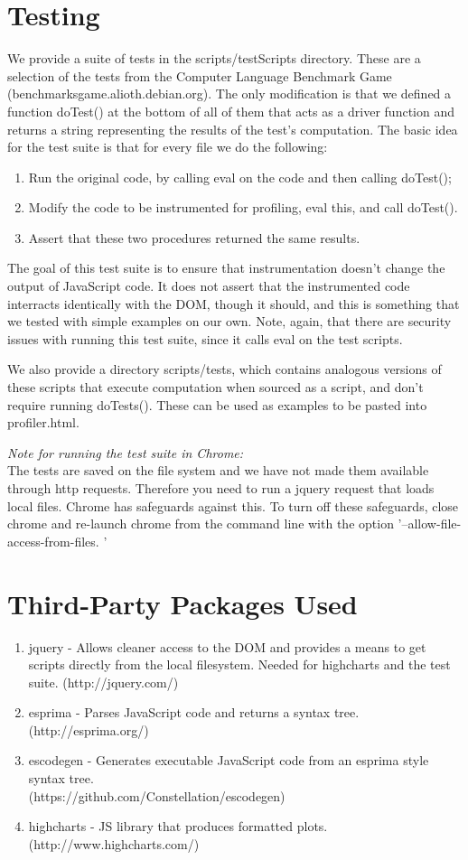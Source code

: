 \documentclass[11pt]{article}
\begin{document}
\section{Testing}
We provide a suite of tests in the scripts/testScripts
directory. These are a selection of the tests from the Computer
Language Benchmark Game (benchmarksgame.alioth.debian.org). The only
modification is that we defined a function doTest() at the bottom of
all of them that acts as a driver function and returns a string
representing the results of the test's computation. The basic idea for
the test suite is that for every file we do the following:
\begin{enumerate}
\item Run the original code, by calling eval on the code and then
  calling doTest();
\item Modify the code to be instrumented for profiling, eval this, and call
  doTest().
\item Assert that these two procedures returned the same results. 
\end{enumerate}
The goal of this test suite is to ensure that instrumentation doesn't
change the output of JavaScript code. It does not assert that the
instrumented code interracts identically with the DOM, though it
should, and this is something that we tested with simple examples on
our own. Note, again, that there are security issues with running this
test suite, since it calls eval on the test scripts. 

We also provide a directory scripts/tests, which contains analogous
versions of these scripts that execute computation when sourced
as a script, and don't require running doTests(). These can be used as
examples to be pasted into profiler.html.

\textit{Note for running the test suite in Chrome: }\\
The tests are saved on the file system and we have not made them
available through http requests. Therefore you need to run a jquery
request that loads local files. Chrome has safeguards against this. To
turn off these safeguards, close chrome and re-launch chrome from the command
line with the option '--allow-file-access-from-files. '

\section{Third-Party Packages Used}
\begin{enumerate}
\item jquery - Allows cleaner access to the DOM and provides a means
  to get scripts directly from the local filesystem. Needed for highcharts
  and the test suite. (http://jquery.com/)
\item esprima - Parses JavaScript code and returns a syntax tree. (http://esprima.org/)
\item escodegen - Generates executable JavaScript code from an esprima style syntax tree. \\(https://github.com/Constellation/escodegen)
\item highcharts - JS library that produces formatted plots. (http://www.highcharts.com/)
\end{enumerate}
\end{document}
